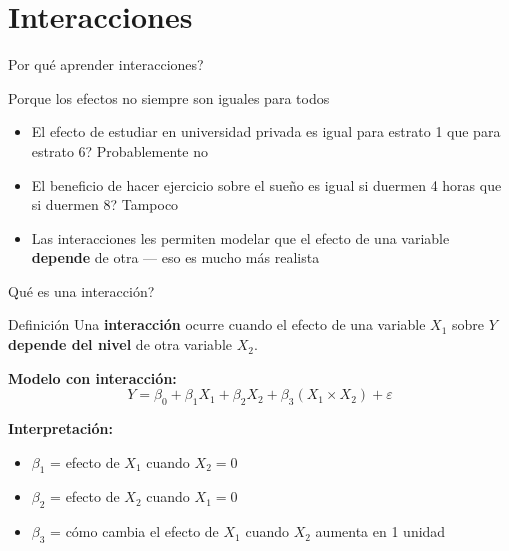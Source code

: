 \documentclass[aspectratio=169, 11pt]{beamer}
\begin{document}
\section{Interacciones}

\begin{frame}{\textquestiondown{}Por qu\'e aprender interacciones?}
\begin{exampleblock}{Porque los efectos no siempre son iguales para todos}
\small
\begin{itemize}\setlength{\itemsep}{2pt}
  \item \textquestiondown{}El efecto de estudiar en universidad privada es igual para estrato 1 que para estrato 6? Probablemente no
  \item \textquestiondown{}El beneficio de hacer ejercicio sobre el sue\~no es igual si duermen 4 horas que si duermen 8? Tampoco
  \item Las interacciones les permiten modelar que el efecto de una variable \textbf{depende} de otra --- eso es mucho m\'as realista
\end{itemize}
\end{exampleblock}
\end{frame}

\begin{frame}{\textquestiondown Qu\'e es una interacci\'on?}
\begin{block}{Definici\'on}
Una \textbf{interacci\'on} ocurre cuando el efecto de una variable $X_1$ sobre $Y$ \textbf{depende del nivel} de otra variable $X_2$.
\end{block}

\vspace{0.2cm}
\textbf{Modelo con interacci\'on:}
\[
Y = \beta_0 + \beta_1 X_1 + \beta_2 X_2 + \beta_3 (X_1 \times X_2) + \varepsilon
\]

\vspace{0.1cm}
\textbf{Interpretaci\'on:}
\begin{itemize}
  \item $\beta_1$ = efecto de $X_1$ cuando $X_2 = 0$
  \item $\beta_2$ = efecto de $X_2$ cuando $X_1 = 0$
  \item $\beta_3$ = c\'omo cambia el efecto de $X_1$ cuando $X_2$ aumenta en 1 unidad
\end{itemize}
\end{frame}
\end{document}
